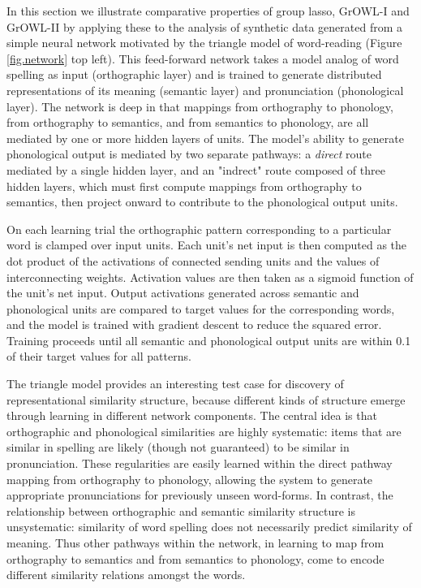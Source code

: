 In this section we illustrate comparative properties of group lasso, GrOWL-I and GrOWL-II by applying these to the analysis of synthetic data generated from a simple neural network motivated by the triangle model of word-reading (Figure \ref{fig.network} top left). This feed-forward network takes a model analog of word spelling as input (orthographic layer) and is trained to generate distributed representations of its meaning (semantic layer) and pronunciation (phonological layer). The network is deep in that mappings from orthography to phonology, from orthography to semantics, and from semantics to phonology, are all mediated by one or more hidden layers of units. The model's ability to generate phonological output is mediated by two separate pathways: a {\em direct} route mediated by a single hidden layer, and an "indrect" route composed of three hidden layers, which must first compute mappings from orthography to semantics, then project onward to contribute to the phonological output units.

On each learning trial the orthographic pattern corresponding to a particular word is clamped over input units. Each unit's net input is then computed as the dot product of the activations of connected sending units and the values of interconnecting weights. Activation values are then taken as a sigmoid function of the unit's net input. Output activations generated across semantic and phonological units are compared to target values for the corresponding words, and the model is trained with gradient descent to reduce the squared error. Training proceeds until all semantic and phonological output units are within 0.1 of their target values for all patterns. 

The triangle model provides an interesting test case for discovery of representational similarity structure, because different kinds of structure emerge through learning in different network components. The central idea is that orthographic and phonological similarities are highly systematic: items that are similar in spelling are likely (though not guaranteed) to be similar in pronunciation. These regularities are easily learned within the direct pathway mapping from orthography to phonology, allowing the system to generate appropriate pronunciations for previously unseen word-forms. In contrast, the relationship between orthographic and semantic similarity structure is unsystematic: similarity of word spelling does not necessarily predict similarity of meaning. Thus other pathways within the network, in learning to map from orthography to semantics and from semantics to phonology, come to encode different similarity relations amongst the words\cite{PlautETAL96,HarmSeidenberg04}.

